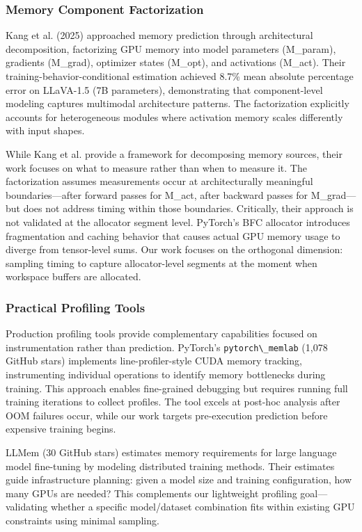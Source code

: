 \subsubsection{Memory Component Factorization}

Kang et al. (2025) approached memory prediction through architectural decomposition, factorizing GPU memory into model parameters (M\_param), gradients (M\_grad), optimizer states (M\_opt), and activations (M\_act). Their training-behavior-conditional estimation achieved 8.7\% mean absolute percentage error on LLaVA-1.5 (7B parameters), demonstrating that component-level modeling captures multimodal architecture patterns. The factorization explicitly accounts for heterogeneous modules where activation memory scales differently with input shapes.

While Kang et al. provide a framework for decomposing memory sources, their work focuses on what to measure rather than when to measure it. The factorization assumes measurements occur at architecturally meaningful boundaries---after forward passes for M\_act, after backward passes for M\_grad---but does not address timing within those boundaries. Critically, their approach is not validated at the allocator segment level. PyTorch's BFC allocator introduces fragmentation and caching behavior that causes actual GPU memory usage to diverge from tensor-level sums. Our work focuses on the orthogonal dimension: sampling timing to capture allocator-level segments at the moment when workspace buffers are allocated.

\subsubsection{Practical Profiling Tools}

Production profiling tools provide complementary capabilities focused on instrumentation rather than prediction. PyTorch's \texttt{pytorch\textbackslash \_memlab} (1,078 GitHub stars) implements line-profiler-style CUDA memory tracking, instrumenting individual operations to identify memory bottlenecks during training. This approach enables fine-grained debugging but requires running full training iterations to collect profiles. The tool excels at post-hoc analysis after OOM failures occur, while our work targets pre-execution prediction before expensive training begins.

LLMem (30 GitHub stars) estimates memory requirements for large language model fine-tuning by modeling distributed training methods. Their estimates guide infrastructure planning: given a model size and training configuration, how many GPUs are needed? This complements our lightweight profiling goal---validating whether a specific model/dataset combination fits within existing GPU constraints using minimal sampling.

